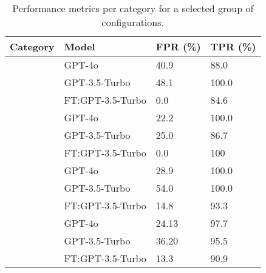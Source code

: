 \begin{table}[!ht]
\centering
\footnotesize
\caption{Performance metrics per category for a selected group of configurations.}
\label{tab:per_cat}
\begin{tabular}{p{1.6cm} p{2.2cm} p{1.2cm} p{1.2cm} }
\toprule
\textbf{Category} & \textbf{Model} & \textbf{FPR (\%)} & \textbf{TPR (\%)} \\
\midrule
{} 
& GPT-4o & 40.9 & 88.0 \\
& GPT-3.5-Turbo & 48.1 & 100.0 \\
& FT:GPT-3.5-Turbo & 0.0 & 84.6 \\
\midrule
{} 
& GPT-4o & 22.2 & 100.0 \\
& GPT-3.5-Turbo & 25.0 & 86.7 \\
& FT:GPT-3.5-Turbo & 0.0 & 100 \\

\midrule
{} 
& GPT-4o & 28.9 & 100.0 \\
& GPT-3.5-Turbo & 54.0 & 100.0  \\
& FT:GPT-3.5-Turbo & 14.8 & 93.3 \\

\midrule
{} 
& GPT-4o & 24.13 & 97.7 \\
& GPT-3.5-Turbo & 36.20 &  95.5  \\

& FT:GPT-3.5-Turbo  & 13.3 & 90.9 \\


\bottomrule
\end{tabular}

\end{table}

